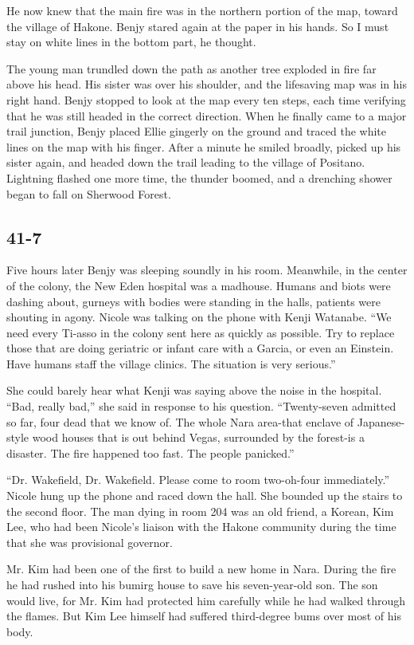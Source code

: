 \documentclass[]{article}
\begin{document}
{He now knew that the main fire was in the northern portion of the map, toward the village of Hakone. Benjy stared again at the paper in his hands. So I must stay on white lines in the bottom part, he thought.

The young man trundled down the path as another tree exploded in fire far above his head. His sister was over his shoulder, and the lifesaving map was in his right hand. Benjy stopped to look at the map every ten steps, each time verifying that he was still headed in the correct direction. When he finally came to a major trail junction, Benjy placed Ellie gingerly on the ground and traced the white lines on the map with his finger. After a minute he smiled broadly, picked up his sister again, and headed down the trail leading to the village of Positano. Lightning flashed one more time, the thunder boomed, and a drenching shower began to fall on Sherwood Forest.


\subsection{41-7}

Five hours later Benjy was sleeping soundly in his room. Meanwhile, in the center of the colony, the New Eden hospital was a madhouse. Humans and biots were dashing about, gurneys with bodies were standing in the halls, patients were shouting in agony. Nicole was talking on the phone with Kenji Watanabe. “We need every Ti-asso in the colony sent here as quickly as possible. Try to replace those that are doing geriatric or infant care with a Garcia, or even an Einstein. Have humans staff the village clinics. The situation is very serious.”

She could barely hear what Kenji was saying above the noise in the hospital. “Bad, really bad,” she said in response to his question. “Twenty-seven admitted so far, four dead that we know of. The whole Nara area-that enclave of Japanese-style wood houses that is out behind Vegas, surrounded by the forest-is a disaster. The fire happened too fast. The people panicked.”

“Dr. Wakefield, Dr. Wakefield. Please come to room two-oh-four immediately.” Nicole hung up the phone and raced down the hall. She bounded up the stairs to the second floor. The man dying in room 204 was an old friend, a Korean, Kim Lee, who had been Nicole’s liaison with the Hakone community during the time that she was provisional governor.

Mr. Kim had been one of the first to build a new home in Nara. During the fire he had rushed into his bumirg house to save his seven-year-old son. The son would live, for Mr. Kim had protected him carefully while he had walked through the flames. But Kim Lee himself had suffered third-degree bums over most of his body.

}
\end{document}
